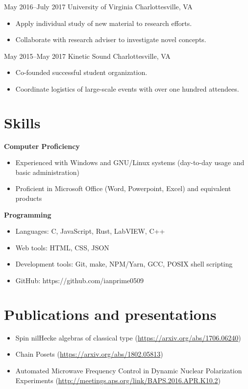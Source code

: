 \documentclass[10pt]{article}
\begin{document}
{May 2016--July 2017}
{University of Virginia}
{Charlottesville, VA}
\begin{itemize}
\item Apply individual study of new material to research efforts.
\item Collaborate with research adviser to investigate novel concepts.
\end{itemize}

{May 2015--May 2017}
{Kinetic Sound}
{Charlottesville, VA}
\begin{itemize}
\item Co-founded successful student organization.
\item Coordinate logistics of large-scale events with over one hundred attendees.
\end{itemize}

\section*{Skills}
\textbf{Computer Proficiency}
\begin{itemize}
\item Experienced with Windows and GNU/Linux systems (day-to-day usage and basic administration)
\item Proficient in Microsoft Office (Word, Powerpoint, Excel) and equivalent products
\end{itemize}

\textbf{Programming}
\begin{itemize}
\item Languages: C, JavaScript, Rust, LabVIEW, C++
\item Web tools: HTML, CSS, JSON
\item Development tools: Git, make, NPM/Yarn, GCC, POSIX shell scripting
\item GitHub: https://github.com/ianprime0509
\end{itemize}

\section*{Publications and presentations}
\begin{itemize}
\item Spin nilHecke algebras of classical type (\url{https://arxiv.org/abs/1706.06240})
\item Chain Posets (\url{https://arxiv.org/abs/1802.05813})
\item Automated Microwave Frequency Control in Dynamic Nuclear Polarization Experiments (\url{http://meetings.aps.org/link/BAPS.2016.APR.K10.2})
\end{itemize}
\end{document}
